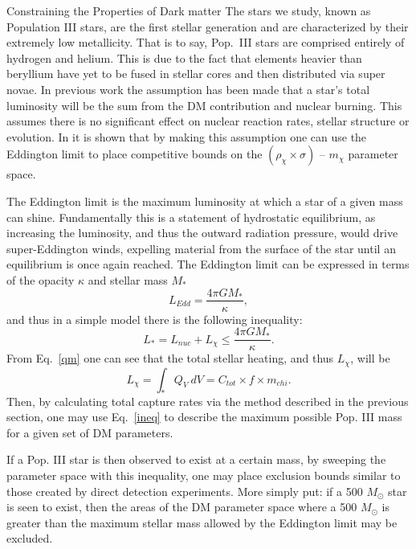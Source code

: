 \documentclass[a4paper,11pt]{article}
\begin{document}
\begin{section}{Constraining the Properties of Dark matter}
    The stars we study, known as Population III stars, are the first stellar generation and are characterized by their extremely low metallicity.
    That is to say, Pop.~III stars are comprised entirely of hydrogen and helium.
    This is due to the fact that elements heavier than beryllium have yet to be fused in stellar cores and then distributed via super novae. 
    In previous work the assumption has been made that a star's total luminosity will be the sum from the DM contribution and nuclear burning. 
    This assumes there is no significant effect on nuclear reaction rates, stellar structure or evolution.
    In \cite{Ilie:2020popiii} it is shown that by making this assumption one can use the Eddington limit to place competitive bounds on the $(\rho_\chi \times \sigma)$ \--- $m_\chi$ parameter space.

    The Eddington limit is the maximum luminosity at which a star of a given mass can shine.
    Fundamentally this is a statement of hydrostatic equilibrium, as increasing the luminosity, and thus the outward radiation pressure, would drive super-Eddington winds, expelling material from the surface of the star until an equilibrium is once again reached.
    The Eddington limit can be expressed in terms of the opacity $\kappa$ and stellar mass $M_*$
    \begin{equation}
        L_{Edd} = \frac{4\pi G M_*}{\kappa},
        \label{edd}
    \end{equation}
    and thus in a simple model there is the following inequality:
    \begin{equation}
        L_{*} = L_{nuc} + L_\chi \leq \frac{4\pi G M_*}{\kappa}. 
        \label{ineq}
    \end{equation}
    From Eq.~\ref{qm} one can see that the total stellar heating, and thus $L_\chi$, will be
    \begin{equation}
    L_\chi = \int_{*} Q_{V} ~ dV = C_{tot} \times f \times m_{chi}.
    \end{equation}
    Then, by calculating total capture rates via the method described in the previous section, one may use Eq.~\ref{ineq} to describe the maximum possible Pop. III mass for a given set of DM parameters. 

    If a Pop. III star is then observed to exist at a certain mass, by sweeping the parameter space with this inequality, one may place exclusion bounds similar to those created by direct detection experiments.
    More simply put: if a 500 $M_\odot$ star is seen to exist, then the areas of the DM parameter space where a 500 $M_\odot$ is greater than the maximum stellar mass allowed by the Eddington limit may be excluded.


\end{section}
\end{document}
